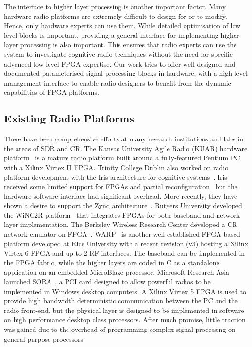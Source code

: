 The interface to higher layer processing is another important factor. Many hardware radio platforms are extremely difficult to design for or to modify. Hence, only hardware experts can use them. While detailed optimisation of low level blocks is important, providing a general interface for implementing higher layer processing is also important. This ensures that radio experts can use the system to investigate cognitive radio techniques without the need for specific advanced low-level FPGA expertise.
Our work tries to offer well-designed and documented parameterised signal processing blocks in hardware, with a high level management interface to enable radio designers to benefit from the dynamic capabilities of FPGA platforms.

\subsection{Existing Radio Platforms}
There have been comprehensive efforts at many research institutions and labs in the areas of SDR and CR.
The Kansas University Agile Radio (KUAR) hardware platform~\cite{Minden2007} is a mature radio platform built around a fully-featured Pentium PC with a Xilinx Virtex II FPGA.
Trinity College Dublin also worked on radio platform development with the Iris architecture for cognitive systems~\cite{Sutton2006}. Iris~\cite{Sutton2010} received some limited support for FPGAs and partial reconfiguration~\cite{fahmy2009,lotze2009} but the hardware-software interface had significant overhead. More recently, they have shown a desire to support the Zynq architecture~\cite{Belt2013}.
Rutgers University developed the WiNC2R platform~\cite{Miljanic2007} that integrates FPGAs for both baseband and network layer implementation.
The Berkeley Wireless Research Center developed a CR network emulator on FPGA~\cite{So2008}.
WARP~\cite{amiri2007} is another well-established FPGA based platform developed at Rice University with a recent revision (v3) hosting a Xilinx Virtex 6 FPGA and up to 2 RF interfaces. The baseband can be implemented in the FPGA fabric, while the higher layers are coded in C as a standalone application on an embedded MicroBlaze processor.
Microsoft Research Asia launched SORA~\cite{tan2011sora}, a PCI card designed to allow powerful radios to be implemented in Windows desktop computers.
A Xilinx Virtex 5 FPGA is used to provide high bandwidth deterministic communication between the PC and the radio front-end, but the physical layer is designed to be implemented in software on high performance desktop class processors.
After much promise, little traction was gained due to the overhead of programming complex signal processing on general purpose processors.

